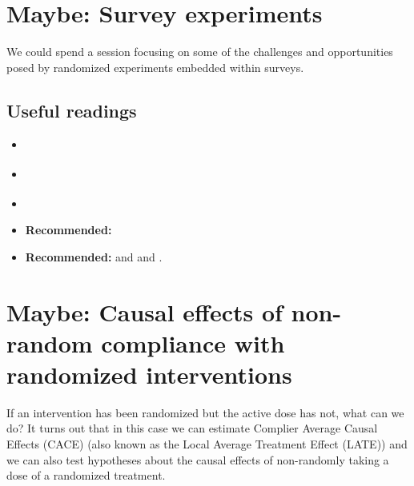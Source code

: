 \documentclass[10pt]{article}
\providecommand{\tightlist}{%
  \setlength{\itemsep}{0pt}\setlength{\parskip}{0pt}}
\begin{document}
\section{Maybe: Survey experiments}

We could spend a session focusing on some of the challenges and opportunities
posed by randomized experiments embedded within surveys.




\subsection{Useful readings}

\begin{itemize}
    \tightlist
    \item \href{https://gustavodiaz.org/files/research/sage_survey_experiments_chapter.pdf}{}
    \item \href{https://egap.org/resource/10-things-to-know-about-survey-experiments/}{}
    \item {}
    \item \textbf{Recommended:} 
    \item \textbf{Recommended:}  and  and .
\end{itemize}



    \section{Maybe: Causal effects of non-random compliance with randomized interventions}

    If an intervention has been randomized but the active
    dose has not, what can we do? It turns out that in this case we can
    estimate Complier Average Causal Effects (CACE) (also known as the Local
    Average Treatment Effect (LATE)) and we can also test hypotheses about the
    causal effects of non-randomly taking a dose of a randomized treatment.
\end{document}

